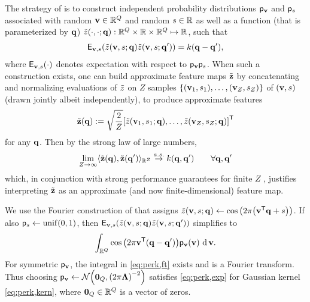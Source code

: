 The strategy of \cite{rahimi:07:rff}
is to construct independent probability distributions 
$\mathsf{p}_{\mathbf{v}}$ and $\mathsf{p}_{s}$
associated with
random $\mathbf{v} \in \mathbb{R}^{Q}$ 
and random $s \in \mathbb{R}$ 
as well as a function 
(that is parameterized by $\mathbf{q}$) 
$\zt\paren{\cdot,\cdot;\bmq} : 
	\reals{\dimQ} \times \real \times \reals{\dimQ} \mapsto \real$,
such that
\begin{align}
	\expect{\bmv,s}{
		\zta{\bmv,s;\bmq}
		\zta{\bmv,s;\bmq'} 
	}
	= k(\bmq-\bmq'),
	\label{eq:perk,exp}
\end{align}
where 
$\expect{\bmv,s}{\cdot}$
denotes expectation with respect to $\mathsf{p}_{\mathbf{v}}\mathsf{p}_{s}$.
When such a construction exists,
one can build
approximate feature maps $\tilde{\mathbf{z}}$
by concatenating and normalizing evaluations 
of $\tilde{z}$ 
on $Z$ samples 
$\set{\paren{\bmv_1,s_1},\dots,\paren{\bmv_Z,s_Z}}$
of $\paren{\bmv,s}$
(drawn jointly albeit independently),
to produce approximate features
\begin{align}
	\bmztZa{\bmq} := \sqrt{\frac{2}{Z}}
		\brac{\zta{\bmv_1,s_1;\bmq},\dots,\zta{\bmv_Z,s_Z;\bmq}}\tpose
	\label{eq:perk,feat}
\end{align}
for any $\mathbf{q}$. 
Then by the strong law of large numbers,
\begin{align}
	\lim_{Z \to \infty} \innprod{
		\bmztZa{\bmq}}{
		\bmztZa{\bmq'}
	}_{\reals{Z}} \overset{a.s.}{\to} k(\bmq,\bmq') \qquad \forall \bmq,\bmq'
	\label{eq:perk,lln}
\end{align}
which, 
in conjunction 
with strong performance guarantees
for finite $Z$ \cite{rahimi:07:rff,sutherland:15:ote}, 
justifies interpreting $\tilde{\mathbf{z}}$ 
as an approximate 
(and now finite-dimensional) feature map.

We use the Fourier construction 
of \cite{rahimi:07:rff}
that assigns
$\zt\paren{\bmv,s;\bmq} 
\gets 
\cosa{2\pi\paren{\bmv\tpose \bmq + s}}$.
If also $\dist{s}\gets\unif{0,1}$, 
then 
$\expect{\bmv,s}{
	\zt\paren{\bmv,s;\bmq}
	\zt\paren{\bmv,s;\bmq'} 
}$
simplifies to
\begin{align}
	\int_{\reals{\dimQ}} \cosa{2\pi\bmv\tpose\paren{\bmq-\bmq'}} \dist{\bmv}\paren{\bmv} \der{\bmv}.
	\label{eq:perk,ft}
\end{align}
For symmetric $\mathsf{p}_{\mathbf{v}}$,
the integral in \eqref{eq:perk,ft} exists \cite{wu:97:gbt}
and is a Fourier transform.
Thus choosing 
$\dist{\bmv}\gets\gauss{\zeros{\dimQ}}{\paren{2\pi\bmL}^{-2}}$
satisfies \eqref{eq:perk,exp}
for Gaussian kernel \eqref{eq:perk,kern},
where $\boldsymbol{0}_{Q} \in \mathbb{R}^{Q}$ is a vector of zeros.

